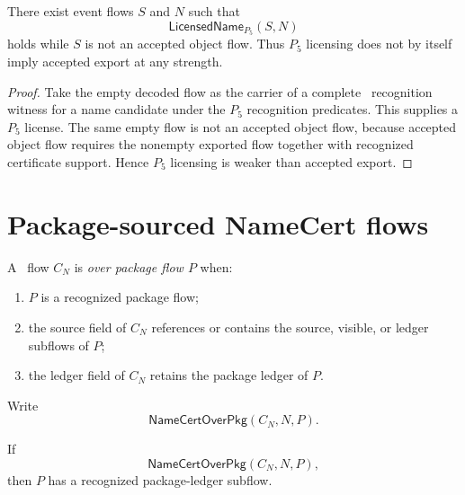 \begin{theorem}
\label{thm:pkg-namecert-p5-license-weaker-than-export}
There exist event flows $S$ and $N$ such that
$$
  \mathsf{LicensedName}_{P_5}(S,N)
$$
holds while $S$ is not an accepted object flow. Thus $P_5$ licensing does not by itself imply accepted export at any strength.
\end{theorem}

\begin{proof}
Take the empty decoded flow as the carrier of a complete \NameCert\ recognition witness for a name candidate under the $P_5$ recognition predicates. This supplies a $P_5$ license. The same empty flow is not an accepted object flow, because accepted object flow requires the nonempty exported flow together with recognized certificate support. Hence $P_5$ licensing is weaker than accepted export.
\end{proof}

\section{Package-sourced NameCert flows}
\label{sec:pkg-namecert-over-package}

\begin{definition}
\label{def:pkg-namecert-over-package}
A \NameCert\ flow $C_N$ is \emph{over package flow $P$} when:
\begin{enumerate}
\item $P$ is a recognized package flow;
\item the source field of $C_N$ references or contains the source, visible, or ledger subflows of $P$;
\item the ledger field of $C_N$ retains the package ledger of $P$.
\end{enumerate}
Write
$$
  \mathsf{NameCertOverPkg}(C_N,N,P).
$$
\end{definition}

\begin{proposition}
\label{prop:pkg-namecert-over-package-requires-ledger}
If
$$
  \mathsf{NameCertOverPkg}(C_N,N,P),
$$
then $P$ has a recognized package-ledger subflow.
\end{proposition}

